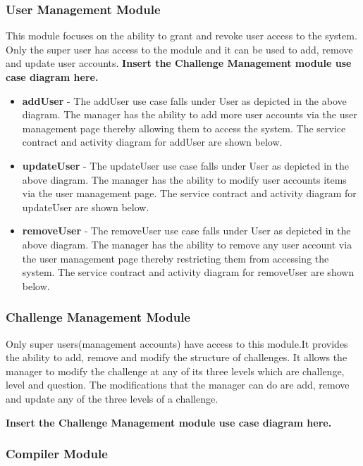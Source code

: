 \documentclass[english]{article}
\begin{document}
		\subsubsection{User Management Module}
		This module focuses on the ability to grant and revoke user access to the system. Only the super user has access to the module and it can be used to add, remove and update user accounts.
\textbf{Insert the Challenge Management module use case diagram here.} \newline
		\begin{itemize}
	  		\item \textbf{addUser} -  The addUser use case falls under User as depicted in the above diagram. The manager has the ability to add more user accounts via the user management page thereby allowing them to access the system. The service contract and activity diagram for addUser are shown below.
	  		
			\item \textbf{updateUser} - The updateUser use case falls under User as depicted in the above diagram. The manager has the ability to modify user accounts items via the user management page. The service contract and activity diagram for updateUser are shown below.
			
			\item \textbf{removeUser} - The removeUser use case falls under User as depicted in the above diagram. The manager has the ability to remove any user account via the user management page thereby restricting them from accessing the system. The service contract and activity diagram for removeUser are shown below.
		\end{itemize}		
		
		\subsubsection{Challenge Management Module}
		Only super users(management accounts) have access to this module.It provides the ability to add, remove and modify the structure of challenges. It allows the manager to modify the challenge at any of its three levels which are challenge, level and question. The modifications that the manager can do are add, remove and update any of the three levels of a challenge.
		
\textbf{Insert the Challenge Management module use case diagram here.} \newline
		\subsubsection{Compiler Module}
\end{document}

